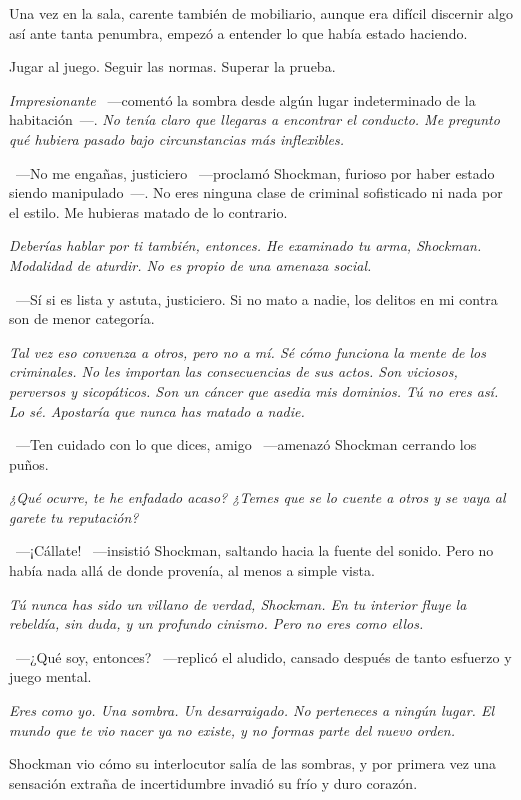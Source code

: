 Una vez en la sala, carente también de mobiliario, aunque era difícil discernir algo así ante tanta penumbra, empezó a entender lo que había estado haciendo.

Jugar al juego. Seguir las normas. Superar la prueba.

\emph{Impresionante} ~---comentó la sombra desde algún lugar indeterminado de la habitación~---. \emph{No tenía claro que llegaras a encontrar el conducto. Me pregunto qué hubiera pasado bajo circunstancias más inflexibles.}

~---No me engañas, justiciero ~---proclamó Shockman, furioso por haber estado siendo manipulado~---. No eres ninguna clase de criminal sofisticado ni nada por el estilo. Me hubieras matado de lo contrario.

\emph{Deberías hablar por ti también, entonces. He examinado tu arma, Shockman. Modalidad de aturdir. No es propio de una amenaza social.}

~---Sí si es lista y astuta, justiciero. Si no mato a nadie, los delitos en mi contra son de menor categoría.

\emph{Tal vez eso convenza a otros, pero no a mí. Sé cómo funciona la mente de los criminales. No les importan las consecuencias de sus actos. Son viciosos, perversos y sicopáticos. Son un cáncer que asedia mis dominios. Tú no eres así. Lo sé. Apostaría que nunca has matado a nadie.}

~---Ten cuidado con lo que dices, amigo ~---amenazó Shockman cerrando los puños.

\emph{¿Qué ocurre, te he enfadado acaso? ¿Temes que se lo cuente a otros y se vaya al garete tu reputación?}

~---¡Cállate! ~---insistió Shockman, saltando hacia la fuente del sonido. Pero no había nada allá de donde provenía, al menos a simple vista.

\emph{Tú nunca has sido un villano de verdad, Shockman. En tu interior fluye la rebeldía, sin duda, y un profundo cinismo. Pero no eres como ellos.}

~---¿Qué soy, entonces? ~---replicó el aludido, cansado después de tanto esfuerzo y juego mental.

\emph{Eres como yo. Una sombra. Un desarraigado. No perteneces a ningún lugar. El mundo que te vio nacer ya no existe, y no formas parte del nuevo orden.}

Shockman vio cómo su interlocutor salía de las sombras, y por primera vez una sensación extraña de incertidumbre invadió su frío y duro corazón.

